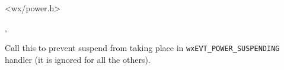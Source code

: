 
<wx/power.h>




, 



\label{wxpowereventveto}


Call this to prevent suspend from taking place in 
\texttt{wxEVT\_POWER\_SUSPENDING} handler (it is ignored for all the others).


